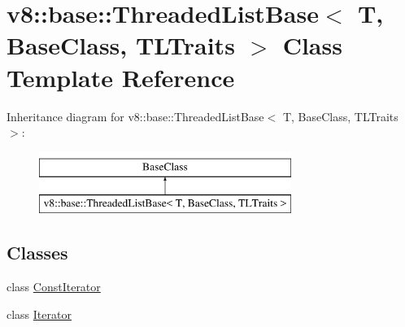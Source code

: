 \hypertarget{classv8_1_1base_1_1ThreadedListBase}{}\section{v8\+:\+:base\+:\+:Threaded\+List\+Base$<$ T, Base\+Class, T\+L\+Traits $>$ Class Template Reference}
\label{classv8_1_1base_1_1ThreadedListBase}
Inheritance diagram for v8\+:\+:base\+:\+:Threaded\+List\+Base$<$ T, Base\+Class, T\+L\+Traits $>$\+:\begin{figure}[H]
\begin{center}
\leavevmode
\includegraphics[height=2.000000cm]{classv8_1_1base_1_1ThreadedListBase}
\end{center}
\end{figure}
\subsection*{Classes}
\begin{DoxyCompactItemize}
\item 
class \mbox{\hyperlink{classv8_1_1base_1_1ThreadedListBase_1_1ConstIterator}{Const\+Iterator}}
\item 
class \mbox{\hyperlink{classv8_1_1base_1_1ThreadedListBase_1_1Iterator}{Iterator}}
\end{DoxyCompactItemize}
